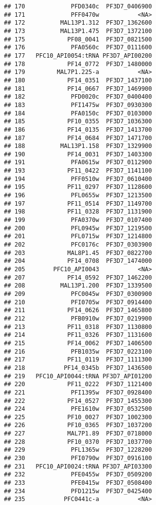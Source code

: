 \documentclass{article}\usepackage[]{graphicx}\usepackage[]{color}
\makeatletter
\newenvironment{kframe}{%
 \def\at@end@of@kframe{}%
 \ifinner\ifhmode%
  \def\at@end@of@kframe{\end{minipage}}%
  \begin{minipage}{\columnwidth}%
 \fi\fi%
 \def\FrameCommand##1{\hskip\@totalleftmargin \hskip-\fboxsep
 \colorbox{shadecolor}{##1}\hskip-\fboxsep
     \hskip-\linewidth \hskip-\@totalleftmargin \hskip\columnwidth}%
 \MakeFramed {\advance\hsize-\width
   \@totalleftmargin\z@ \linewidth\hsize
   \@setminipage}}%
 {\par\unskip\endMakeFramed%
 \at@end@of@kframe}
\newenvironment{knitrout}{}{} %
\makeatother
\begin{document}
\begin{knitrout}
\begin{kframe}
\begin{verbatim}
## 170             PFD0340c  PF3D7_0406900
## 171             PFF0470w           <NA>
## 172          MAL13P1.312  PF3D7_1362600
## 173          MAL13P1.475  PF3D7_1372100
## 175            PF08_0041  PF3D7_0821500
## 176             PFA0560c  PF3D7_0111600
## 177   PFC10_API0054:tRNA PF3D7_API00200
## 178            PF14_0772  PF3D7_1480000
## 179         MAL7P1.225-a           <NA>
## 180            PF14_0351  PF3D7_1437100
## 181            PF14_0667  PF3D7_1469900
## 182             PFD0020c  PF3D7_0400400
## 183             PFI1475w  PF3D7_0930300
## 184             PFA0150c  PF3D7_0103000
## 185            PF10_0355  PF3D7_1036300
## 186            PF14_0135  PF3D7_1413700
## 187            PF14_0684  PF3D7_1471700
## 188          MAL13P1.158  PF3D7_1329900
## 190            PF14_0031  PF3D7_1403300
## 191             PFA0615w  PF3D7_0112900
## 193            PF11_0422  PF3D7_1141100
## 194             PFF0510w  PF3D7_0610400
## 195            PF11_0297  PF3D7_1128600
## 196             PFL0655w  PF3D7_1213500
## 197            PF11_0514  PF3D7_1149700
## 198            PF11_0328  PF3D7_1131900
## 199             PFA0370w  PF3D7_0107400
## 200             PFL0945w  PF3D7_1219500
## 201             PFL0715w  PF3D7_1214800
## 202             PFC0176c  PF3D7_0303900
## 203            MAL8P1.45  PF3D7_0822700
## 204            PF14_0708  PF3D7_1474000
## 205        PFC10_API0043           <NA>
## 207            PF14_0592  PF3D7_1462200
## 208          MAL13P1.200  PF3D7_1339500
## 209             PFC0045w  PF3D7_0300900
## 210             PFI0705w  PF3D7_0914400
## 211            PF14_0626  PF3D7_1465800
## 212             PFB0910w  PF3D7_0219900
## 213            PF11_0318  PF3D7_1130800
## 214            PF11_0326  PF3D7_1131600
## 215            PF14_0062  PF3D7_1406500
## 216             PFB1035w  PF3D7_0223100
## 217            PF11_0119  PF3D7_1111300
## 218           PF14_0345b  PF3D7_1436500
## 219   PFC10_API0044:tRNA PF3D7_API01200
## 220            PF11_0222  PF3D7_1121400
## 221             PFI1395w  PF3D7_0928400
## 222            PF14_0527  PF3D7_1455300
## 224             PFE1610w  PF3D7_0532500
## 225            PF10_0027  PF3D7_1002300
## 226            PF10_0365  PF3D7_1037200
## 227            MAL7P1.89  PF3D7_0718000
## 228            PF10_0370  PF3D7_1037700
## 229             PFL1365w  PF3D7_1228200
## 230             PFI0790w  PF3D7_0916100
## 231   PFC10_API0024:tRNA PF3D7_API03300
## 232             PFE0455w  PF3D7_0509200
## 233             PFE0415w  PF3D7_0508400
## 234             PFD1215w  PF3D7_0425400
## 235           PFC0441c-a           <NA>

\end{verbatim}
\end{kframe}
\end{knitrout}
\end{document}
